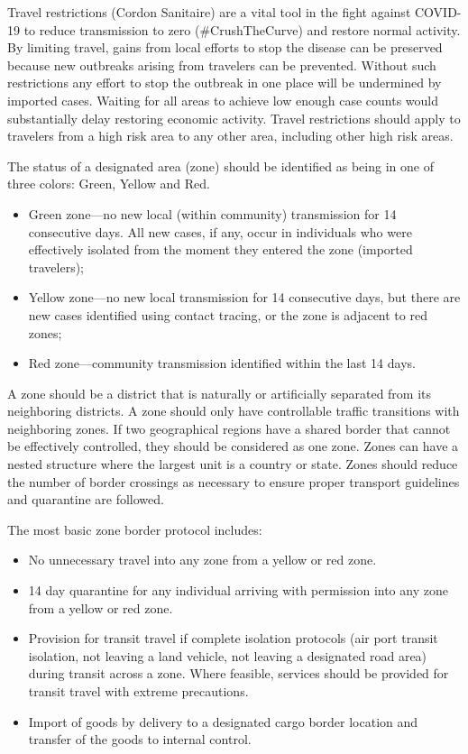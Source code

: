 \documentclass[onecolumn,journal]{IEEEtran}
\begin{document}
\begin{multicols}{2}

Travel restrictions (Cordon Sanitaire) are a vital tool in the fight against COVID-19 to reduce transmission to zero ($\#$CrushTheCurve) and restore normal activity. By limiting travel, gains from local efforts to stop the disease can be preserved because new outbreaks arising from travelers can be prevented. Without such restrictions any effort to stop the outbreak in one place will be undermined by imported cases. Waiting for all areas to achieve low enough case counts would substantially delay restoring economic activity. Travel restrictions should apply to travelers from a high risk area to any other area, including other high risk areas. 

The status of a designated area (zone) should be identified as being in one of three colors: Green, Yellow and Red. 
\begin{itemize}
\item Green zone---no new local (within community) transmission for 14 consecutive days. All new cases, if any, occur in individuals who were effectively isolated from the moment they entered the zone (imported travelers);
\item Yellow zone---no new local transmission for 14 consecutive days, but there are new cases identified using contact tracing, or the zone is adjacent to red zones;
\item Red zone---community transmission identified within the last 14 days.
\end{itemize}
A zone should be a district that is naturally or artificially separated from its neighboring districts. A zone should only have controllable traffic transitions with neighboring zones. If two geographical regions have a shared border that cannot be effectively controlled, they should be considered as one zone. Zones can have a nested structure where the largest unit is a country or state. Zones should reduce the number of border crossings as necessary to ensure proper transport guidelines and quarantine are followed.

The most basic zone border protocol includes: 
\begin{itemize}
\item No unnecessary travel into any zone from a yellow or red zone.
\item 14 day quarantine for any individual arriving with permission into any zone from a yellow or red zone.
\item Provision for transit travel if complete isolation protocols (air port transit isolation, not leaving a land vehicle, not leaving a designated road area) during transit across a zone. Where feasible, services should be provided for transit travel with extreme precautions.
\item Import of goods by delivery to a designated cargo border location and transfer of the goods to internal control. 
\end{itemize}


\end{multicols}
\end{document}
